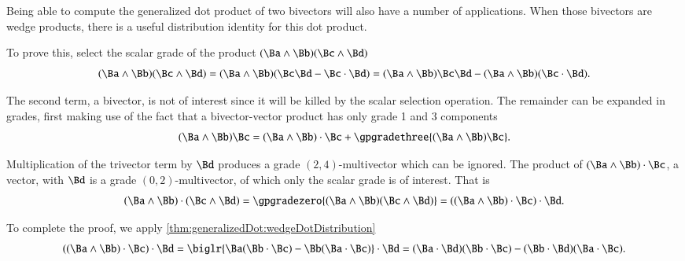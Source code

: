 %
%
Being able to compute the generalized dot product of two bivectors will also have a number of applications.
When those bivectors are wedge products, there is a useful distribution identity for this dot product.


To prove this, select the scalar grade of the product \( (\Ba \wedge \Bb) (\Bc \wedge \Bd) \)
\begin{dmath}\label{eqn:generalizedDot_bivectorDot:1160}
(\Ba \wedge \Bb) (\Bc \wedge \Bd)
=
(\Ba \wedge \Bb) (\Bc \Bd - \Bc \cdot \Bd)
=
(\Ba \wedge \Bb) \Bc \Bd -
(\Ba \wedge \Bb) (\Bc \cdot \Bd).
\end{dmath}

The second term, a bivector, is not of interest since it will be killed by the scalar selection operation.
The remainder can be expanded in grades, first making use of the fact that a bivector-vector product has only
grade 1 and 3 components
\begin{dmath}\label{eqn:generalizedDot_bivectorDot:1180}
(\Ba \wedge \Bb) \Bc
=
(\Ba \wedge \Bb) \cdot \Bc
+ \gpgradethree{ (\Ba \wedge \Bb) \Bc }.
\end{dmath}

Multiplication of the trivector term by \( \Bd \) produces a grade \((2,4)\)-multivector which can be ignored.
The product
of \( (\Ba \wedge \Bb) \cdot \Bc \), a vector, with \( \Bd \) is a grade \((0,2)\)-multivector, of which only the scalar grade is of interest.
That is
\begin{dmath}\label{eqn:generalizedDot_bivectorDot:1220}
(\Ba \wedge \Bb) \cdot (\Bc \wedge \Bd)
= \gpgradezero{ (\Ba \wedge \Bb) (\Bc \wedge \Bd) }
=
((\Ba \wedge \Bb) \cdot \Bc )\cdot \Bd.
\end{dmath}

To complete the proof, we apply \cref{thm:generalizedDot:wedgeDotDistribution}
\begin{dmath}\label{eqn:generalizedDot_bivectorDot:1240}
((\Ba \wedge \Bb) \cdot \Bc )\cdot \Bd
=
\biglr{ \Ba (\Bb \cdot \Bc) - \Bb (\Ba \cdot \Bc) } \cdot \Bd
=
(\Ba \cdot \Bd) (\Bb \cdot \Bc) - (\Bb \cdot \Bd) (\Ba \cdot \Bc).
\end{dmath}

